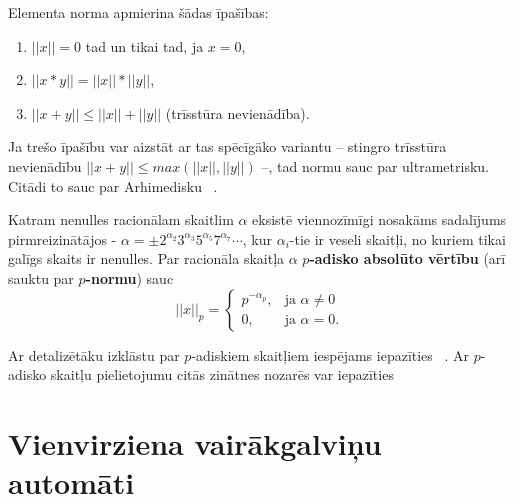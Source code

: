 \documentclass{ludis}
\begin{document}
Elementa norma apmierina šādas īpašības:
\begin{enumerate}
\item $||x||=0$ tad un tikai tad, ja $x=0$,
\item $||x*y|| = ||x||*||y||$,
\item $||x+y|| \leq ||x||+||y||$ (trīsstūra nevienādība).
\end{enumerate}
Ja trešo īpašību var aizstāt ar tas spēcīgāko variantu -- stingro trīsstūra nevienādību $||x+y|| \leq max(||x||,||y||)$ --, tad normu sauc par ultrametrisku. Citādi to sauc par Arhimedisku ~\citep{Freivalds2012}.

\begin{definicija}
Katram nenulles racionālam skaitlim $\alpha$ eksistē viennozīmīgi nosakāms sadalījums pirmreizinātājos - $\alpha = \pm 2^{\alpha_2}3^{\alpha_3}5^{\alpha_5}7^{\alpha_7} \cdots$, kur $\alpha_i$-tie ir veseli skaitļi, no kuriem tikai galīgs skaits ir nenulles. Par racionāla skaitļa $\alpha$ \textbf{$p$-adisko absolūto vērtību} (arī sauktu par \textbf{$p$-normu}) sauc 
\[
||x||_p = \begin{cases}
p^{-\alpha_p}, &\textrm{ja } \alpha \neq 0 \\
0, &\textrm{ja } \alpha = 0.
\end{cases}
\]
\end{definicija}

Ar detalizētāku izklāstu par $p$-adiskiem skaitļiem iespējams iepazīties ~\citep{Madore}. Ar $p$-adisko skaitļu pielietojumu citās zinātnes nozarēs var iepazīties ~\citep{V.S.Vladimirov1995,Kozyrev2006,Dragovich2009}

\chapter{Vienvirziena vairākgalviņu automāti}
\end{document}
